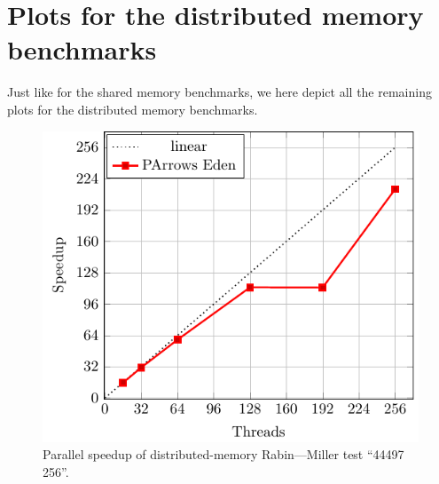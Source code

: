 \documentclass[paper=A4,twoside=true,openright,parskip=full,chapterprefix=true,headings=normal,bibliography=totoc,listof=totoc,titlepage=on,captions=tableabove,draft=false,british]{scrreprt}%
\renewcommand{\enquote}[1]{{``}#1{''}}
\begin{document}
\hypertarget{plots-for-the-distributed-memory-benchmarks}{%
\section{Plots for the distributed memory
benchmarks}\label{plots-for-the-distributed-memory-benchmarks}}

\label{sec:benchmarkDistPlots}

Just like for the shared memory benchmarks, we here depict all the
remaining plots for the distributed memory benchmarks.

\vfill

\begin{figure}[h]
\centering
\includegraphics{src/img/perfDistRM256.pdf}
\caption{Parallel speedup of distributed-memory Rabin---Miller test
\enquote{44497 256}.\label{fig:perfDistRM256}}
\end{figure}

\vfill
\end{document}
